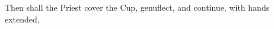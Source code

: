 \begin{rubric}
	Then shall the Priest cover the Cup, genuflect, and continue, with hands extended,
\end{rubric}


